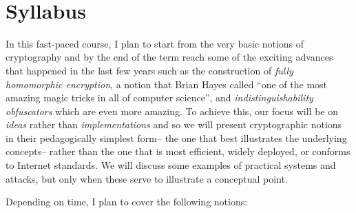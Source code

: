 ~

\section{Syllabus}\label{Syllabus}

In this fast-paced course, I plan to start from the very basic notions
of cryptography and by the end of the term reach some of the exciting
advances that happened in the last few years such as the construction of
\emph{fully homomorphic encryption}, a notion that Brian Hayes called
``one of the most amazing magic tricks in all of computer science'', and
\emph{indistinguishability obfuscators} which are even more amazing. To
achieve this, our focus will be on \emph{ideas} rather than
\emph{implementations} and so we will present cryptographic notions in
their pedagogically simplest form-- the one that best illustrates the
underlying concepts-- rather than the one that is most efficient, widely
deployed, or conforms to Internet standards. We will discuss some
examples of practical systems and attacks, but only when these serve to
illustrate a conceptual point.

Depending on time, I plan to cover the following notions:

